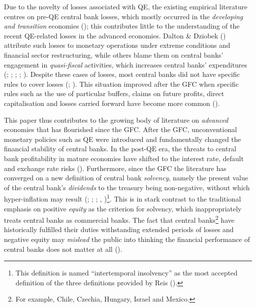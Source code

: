 \documentclass[
  a4paper,
  abstract=true]{scrartcl}
\theoremstyle{definition}
\begin{document}
Due to the novelty of losses associated with QE, the existing empirical
literature centres on pre-QE central bank losses, which mostly occurred
in the \emph{developing and transition} economies
(); this contributes little
to the understanding of the recent QE-related losses in the advanced
economies. Dalton \& Dziobek () attribute
such losses to monetary operations under extreme conditions and
financial sector restructuring, while others blame them on central
banks' engagement in \emph{quasi-fiscal} activities, which increases
central banks' expenditures (; ;
;
;
). Despite these cases of
losses, most central banks did not have specific rules to cover losses
(;
). This situation
improved after the GFC when specific rules such as the use of particular
buffers, claims on future profits, direct capitalisation and losses
carried forward have become more common ().

This paper thus contributes to the growing body of literature on
\emph{advanced} economies that has flourished since the GFC. After the
GFC, unconventional monetary policies such as QE were introduced and
fundamentally changed the financial stability of central banks. In the
post-QE era, the threats to central bank profitability in mature
economies have shifted to the interest rate, default and exchange rate
risks (). Furthermore, since
the GFC the literature has converged on a new definition of central bank
\emph{solvency}, namely the present value of the central bank's
\emph{dividends} to the treasury being non-negative, without which
hyper-inflation may result (; ;
;
,
)\footnote{This definition is named
  ``intertemporal insolvency'' as the most accepted definition of the
  three definitions provided by Reis ().}.
This is in stark contrast to the traditional emphasis on positive
\emph{equity} as the criterion for solvency, which inappropriately
treats central banks as commercial banks. The fact that central
banks\footnote{For example, Chile, Czechia, Hungary, Israel and Mexico.}
have historically fulfilled their duties withstanding extended periods
of losses and negative equity may \emph{mislead} the public into
thinking the financial performance of central banks does not matter at
all ().
\end{document}
